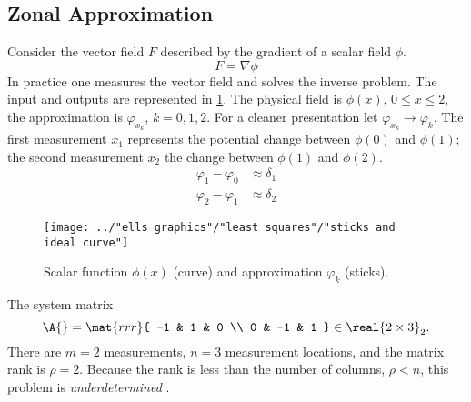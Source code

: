 \subsection{\label{ssec:zonal approx}Zonal Approximation}  %
Consider the vector field $F$ described by the gradient of a scalar field $\phi$.
  \begin{equation*}   %
    F = \nabla \phi
  \end{equation*}
In practice one measures the vector field and solves the inverse problem. The input and outputs are represented in \ref{fig:sticks}. The physical field is $\phi(x)$, $0\le x \le 2$, the approximation is $\varphi_{x_{k}}$, $k=0,1,2$. For a cleaner presentation let $\varphi_{x_{k}} \rightarrow \varphi_{k}$. The first measurement $x_{1}$ represents the potential change between $\phi(0)$ and $\phi(1)$; the second measurement $x_{2}$ the change between $\phi(1)$ and $\phi(2)$.
  \begin{equation*}   %
    \begin{split}
      \varphi_{1} - \varphi_{0} &\approx \delta_{1} \\
      \varphi_{2} - \varphi_{1} &\approx \delta_{2}
    \end{split}
  \end{equation*}
\begin{figure}[htbp] %
   \centering
   \texttt{[image: ../"ells graphics"/"least squares"/"sticks and ideal curve"]} 
   \caption[Scalar function $\phi$ and approximations.]{Scalar function $\phi(x)$ (curve) and approximation $\varphi_{k}$ (sticks).}
   \label{fig:sticks}
\end{figure}

The system matrix 
  \begin{equation*}   %
      \A{} =     \mat{rrr}{ 
      -1 & 1 & 0 \\
       0 & -1 & 1 } \in \real{2 \times 3}_{2}.
  \end{equation*}
There are $m = 2$ measurements, $n = 3$ measurement locations, and the matrix rank is $\rho = 2$. Because the rank is less than the number of columns, $\rho < n$, this problem is \emph{underdetermined} .

